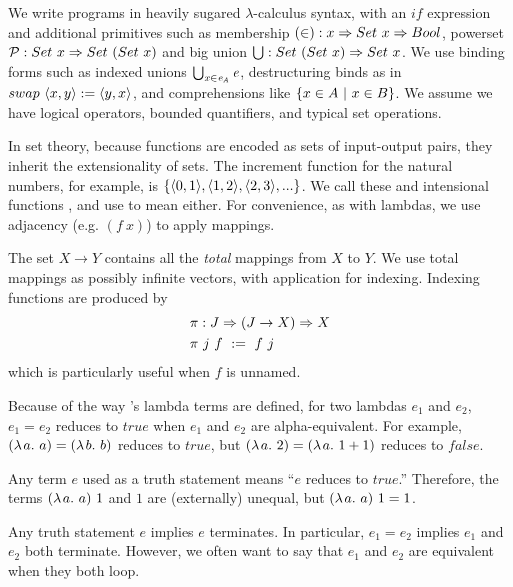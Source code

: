 \documentclass{llncs}
\begin{document}
We write \lzfclang programs in heavily sugared $\lambda$-calculus syntax, with an $if$ expression and additional primitives such as membership $(\in) : x \Rightarrow Set~x \Rightarrow Bool$, powerset $\mathcal{P} : Set~x \Rightarrow Set~(Set~x)$ and big union $\textstyle\bigcup : Set~(Set~x) \Rightarrow Set~x$.
We use binding forms such as indexed unions $\textstyle\bigcup_{\mathit{x} \in \mathit{e_A}}\mathit{e}$, destructuring binds as in $swap~\langle{x,y}\rangle := \langle{y,x}\rangle$, and comprehensions like $\lbrace {x \in A} \ \lvert\ {x \in B} \rbrace$.
We assume we have logical operators, bounded quantifiers, and typical set operations.

In set theory, because functions are encoded as sets of input-output pairs, they inherit the extensionality of sets.
The increment function for the natural numbers, for example, is $\{{\langle{0,1}\rangle,\langle{1,2}\rangle,\langle{2,3}\rangle,...}\}$.
We call these  and intensional functions , and use  to mean either.
For convenience, as with lambdas, we use adjacency (e.g. $(f~x)$) to apply mappings.

The set $X \to Y$ contains all the \emph{total} mappings from $X$ to $Y$.
We use total mappings as possibly infinite vectors, with application for indexing.
Indexing functions are produced by
\begin{equation}
\begin{aligned}
	&\pi : J \Rightarrow (J \to X) \Rightarrow X \\
	&\pi~j~f \ := \ f~j
\end{aligned}
\end{equation}
which is particularly useful when $f$ is unnamed.

Because of the way \lzfclang's lambda terms are defined, for two lambdas $\mathit{e}_1$ and $\mathit{e}_2$, $\mathit{e}_1 = \mathit{e}_2$ reduces to $true$ when $\mathit{e}_1$ and $\mathit{e}_2$ are alpha-equivalent.
For example, $(\lambda\mspace{2mu}{a}\ldotp\,{a}) = (\lambda\mspace{2mu}{b}\ldotp\,{b})$ reduces to $true$, but $(\lambda\mspace{2mu}{a}\ldotp\,{2}) = (\lambda\mspace{2mu}{a}\ldotp\,{1+1})$ reduces to $false$.

Any \lzfclang term $\mathit{e}$ used as a truth statement means ``$\mathit{e}$ reduces to $true$.''
Therefore, the terms $(\lambda\mspace{2mu}{a}\ldotp\,{a})~1$ and $1$ are (externally) unequal, but $(\lambda\mspace{2mu}{a}\ldotp\,{a})~1 = 1$.

Any truth statement $\mathit{e}$ implies $\mathit{e}$ terminates.
In particular, $\mathit{e}_1 = \mathit{e}_2$ implies $\mathit{e}_1$ and $\mathit{e}_2$ both terminate.
However, we often want to say that $\mathit{e}_1$ and $\mathit{e}_2$ are equivalent when they both loop.
\end{document}
